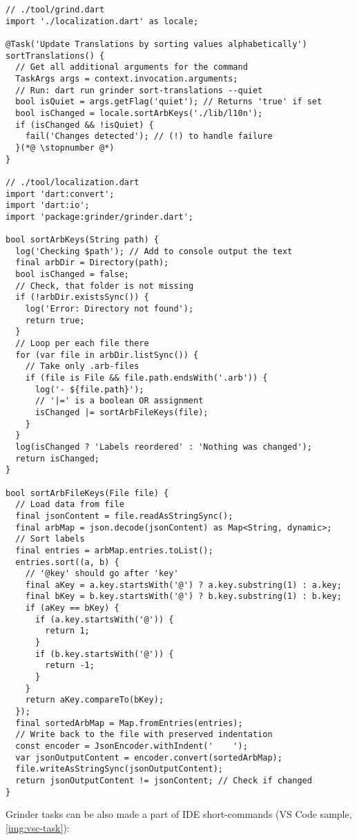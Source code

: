 \begin{lstlisting}
// ./tool/grind.dart
import './localization.dart' as locale;

@Task('Update Translations by sorting values alphabetically')
sortTranslations() {
  // Get all additional arguments for the command
  TaskArgs args = context.invocation.arguments;
  // Run: dart run grinder sort-translations --quiet
  bool isQuiet = args.getFlag('quiet'); // Returns 'true' if set
  bool isChanged = locale.sortArbKeys('./lib/l10n');
  if (isChanged && !isQuiet) {
    fail('Changes detected'); // (!) to handle failure
  }(*@ \stopnumber @*)
}

// ./tool/localization.dart
import 'dart:convert';
import 'dart:io';
import 'package:grinder/grinder.dart';

bool sortArbKeys(String path) {
  log('Checking $path'); // Add to console output the text
  final arbDir = Directory(path);
  bool isChanged = false;
  // Check, that folder is not missing
  if (!arbDir.existsSync()) {
    log('Error: Directory not found');
    return true;
  }
  // Loop per each file there
  for (var file in arbDir.listSync()) {
    // Take only .arb-files
    if (file is File && file.path.endsWith('.arb')) {
      log('- ${file.path}');
      // '|=' is a boolean OR assignment
      isChanged |= sortArbFileKeys(file);
    }
  }
  log(isChanged ? 'Labels reordered' : 'Nothing was changed');
  return isChanged;
}

bool sortArbFileKeys(File file) {
  // Load data from file
  final jsonContent = file.readAsStringSync();
  final arbMap = json.decode(jsonContent) as Map<String, dynamic>;
  // Sort labels
  final entries = arbMap.entries.toList();
  entries.sort((a, b) {
    // '@key' should go after 'key'
    final aKey = a.key.startsWith('@') ? a.key.substring(1) : a.key;
    final bKey = b.key.startsWith('@') ? b.key.substring(1) : b.key;
    if (aKey == bKey) {
      if (a.key.startsWith('@')) {
        return 1;
      }
      if (b.key.startsWith('@')) {
        return -1;
      }
    }
    return aKey.compareTo(bKey);
  });
  final sortedArbMap = Map.fromEntries(entries);
  // Write back to the file with preserved indentation
  const encoder = JsonEncoder.withIndent('    ');
  var jsonOutputContent = encoder.convert(sortedArbMap);
  file.writeAsStringSync(jsonOutputContent);
  return jsonOutputContent != jsonContent; // Check if changed
}
\end{lstlisting}

\noindent Grinder tasks can be also made a part of IDE short-commands (VS Code sample, \cref{img:vsc-task}):

